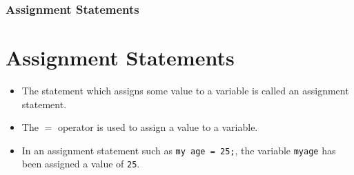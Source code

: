 \documentclass{beamer}
\begin{document}
\begin{frame}
    \frametitle{Assignment Statements}
    \section{Assignment Statements} %
    \label{sec:assignment}
    \begin{itemize}
        \item The statement which assigns some value to a variable is called an assignment statement.
        \item The $=$ operator is used to assign a value to a variable.
        \item In an assignment statement such as \texttt{my age = 25;}, the variable \texttt{myage} has been assigned a value of \texttt{25}.
    \end{itemize}
\end{frame}
\end{document}
